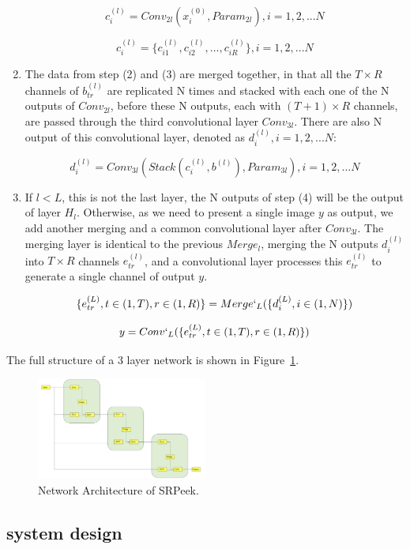 \begin{enumerate}
$$ c_i^{(l)} = Conv_{2l}(x_i^{(0)},Param_{2l}), i=1,2,...N$$

$$ c_i^{(l)} = \{c_{i1}^{(l)},c_{i2}^{(l)},...,c_{iR}^{(l)}\}, i=1,2,...N$$

\item The data from step (2) and (3) are merged together, in that all the $T\times R$ channels of $b_{tr}^{(l)}$ are replicated N times and stacked with each one of the N outputs of $Conv_{2l}$, before these N outputs, each with $(T+1)\times R$ channels, are passed through the third convolutional layer $Conv_{3l}$. There are also N output of this convolutional layer, denoted as $d_i^{(l)}, i=1,2,...N$:

$$ d_i^{(l)} = Conv_{3l}(Stack(c_i^{(l)},b^{(l)}),Param_{3l}), i=1,2,...N $$

\item If $l < L$, this is not the last layer, the N outputs of step (4) will be the output of layer $H_l$. Otherwise, as we need to present a single image $y$ as output, we add another merging and a common convolutional layer after $Conv_{3l}$. The merging layer is identical to the previous $Merge_l$, merging the N outputs $d_i^{(l)}$ into $T\times R$ channels $e_{tr}^{(l)}$, and a convolutional layer processes this $e_{tr}^{(l)}$ to generate a single channel of output $y$. 


$$ \{e_{tr}^{(L)},t\in (1,T),r\in (1,R)\} = Merge`_{L}(\{d_i^{(L)},i\in (1,N)\})$$


$$ y = Conv`_{L}(\{e_{tr}^{(L)},t\in (1,T),r\in (1,R)\})$$


\end{enumerate}

The full structure of a 3 layer network is shown in Figure~\ref{fig-system}.

\begin{figure}
 \centering
    \includegraphics[width=0.5\textwidth]{./pic/design.pdf}
    \caption{Network Architecture of SRPeek.}
    \label{fig-system}
\end{figure}

\subsection{system design}


